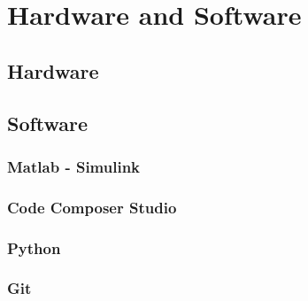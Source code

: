 \chapter{Hardware and Software}
\label{hardwareandsoftware}

\section{Hardware}

\section{Software}
\subsection{Matlab - Simulink}
\subsection{Code Composer Studio}
\subsection{Python}
\subsection{Git}
